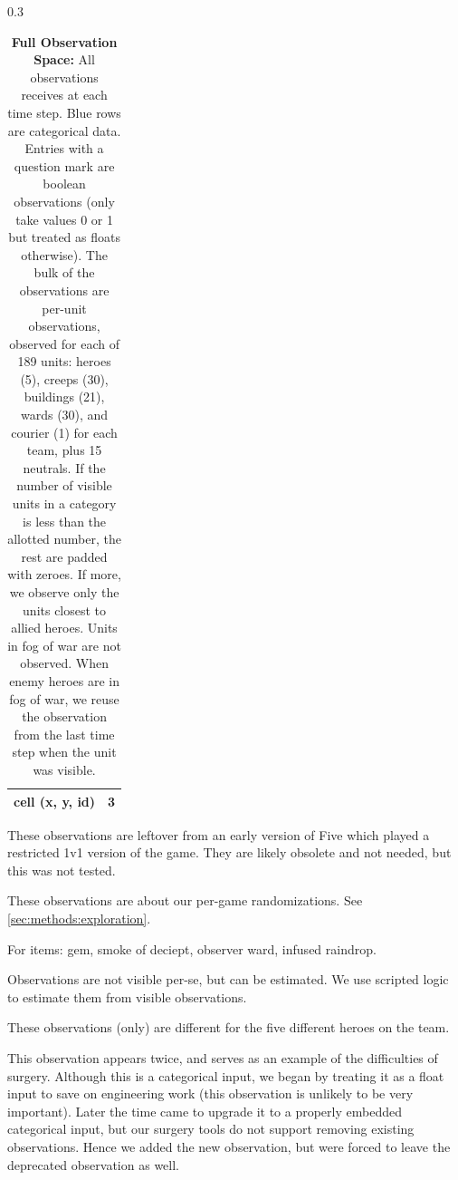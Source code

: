 \documentclass[ocean-paper.tex]{subfiles}
\begin{document}
\begin{table}
\begin{scriptsize}
\begin{threeparttable}
\begin{subtable}[t]{0.3\textwidth}
\begin{tabular}[t]{|p{4cm}|c|}
  cell (x, y, id) & 3 \\\hline
\end{tabular}
\end{subtable}
\end{threeparttable}
\begin{threeparttable}
\begin{tablenotes}
    \item[a] These observations are leftover from an early version of Five which played a restricted 1v1 version of the game. They are likely obsolete and not needed, but this was not tested.
    \item[b] These observations are about our per-game randomizations. See \autoref{sec:methods:exploration}.
    \item[c] For items: gem, smoke of deciept, observer ward, infused raindrop.
    \item[d] Observations are not visible per-se, but can be estimated. We use scripted logic to estimate them from visible observations.
    \item[e] These observations (only) are different for the five different heroes on the team.
    \item[f] This observation appears twice, and serves as an example of the difficulties of surgery. Although this is a categorical input, we began by treating it as a float input to save on engineering work (this observation is unlikely to be very important). Later the time came to upgrade it to a properly embedded categorical input, but our surgery tools do not support removing existing observations. Hence we added the new observation, but were forced to leave the deprecated observation as well.
\end{tablenotes}
\end{threeparttable}
\end{scriptsize}
\caption{
\textbf{Full Observation Space: }
All observations \openaifive receives at each time step. Blue rows are categorical data. Entries with a question mark are boolean observations (only take values 0 or 1 but treated as floats otherwise). The bulk of the observations are per-unit observations, observed for each of 189 units: heroes (5), creeps (30), buildings (21), wards (30), and courier (1) for each team, plus 15 neutrals. If the number of visible units in a category is less than the allotted number, the rest are padded with zeroes. If more, we observe only the units closest to allied heroes. Units in fog of war are not observed. When enemy heroes are in fog of war, we reuse the observation from the last time step when the unit was visible.
}
\label{table:full-obs}
\end{table}
\end{document}
